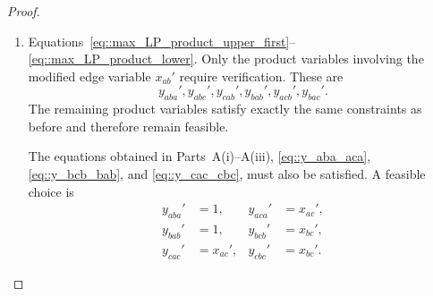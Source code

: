 \documentclass[11pt]{article}
\begin{document}
\begin{proof}
\begin{enumerate}[label=\Alph*.]
\begin{enumerate}[label=(\roman*)]
        \item Consider $y_{bab}'$ and $y_{bcb}'$. By Equation~\eqref{eq::y_bab_bcb}, $y_{bab}'+y_{bcb}'=x_{ab}'+x_{bc}'$ which is satisfied by the selection
          \[
          y_{bab}'=x_{ab}',\quad y_{bcb}'=x_{bc}'. 
          \] 
          Equation~\eqref{eq::max_LP_symmetry_x} and Equation~\eqref{eq::max_LP_x_upper_bound} giving $x_{ab}' \leq 1$, $x_{bc}' \leq 1$ gives
          \[
          y_{bab}'=x_{ab}' \leq x_{ba}',\quad y_{bab}'=x_{ab}'\leq x_{ab}', \quad y_{bab}'=x_{ab}' \geq x_{ba}'+x_{ab}'-1
          \]
          \[
          y_{bcb}'=x_{bc}' \leq x_{bc},\quad y_{bcb}'=x_{bc}' \leq x_{cb}', \quad y_{bcb}'=x_{bc}' \geq x_{bc}'+x_{cb}'-1
          \]
          Hence Equations~\eqref{eq::max_LP_product_upper_first}--\eqref{eq::max_LP_product_lower} are satisfied.
        \item Consider $y_{abc}'$. Since $x_{ab}'=1$, Equations~\eqref{eq::max_LP_product_upper_first}--\eqref{eq::max_LP_product_lower} give
          \[
          y_{abc}'\ge x_{ab}'+x_{bc}'-1 = x_{bc}', \quad  y_{abc}' \leq x_{ab}', \quad  y_{abc}' \leq x_{bc}'.
          \]
          If $x_{bc}' < 1$, then $y_{abc}' = x_{bc}'$ satisfies all constraints and if $x_{bc}'=1$ then $y_{abc}' = 1$ satisfies all constraints.  
        \item Consider $y_{acb}'$. Since neither $x_{ac}'$ nor $x_{cb}'$ has been modified, all three product constraints are unchanged and therefore remain satisfied.
      \end{enumerate}
    \item Equations~\eqref{eq::max_LP_product_upper_first}--\eqref{eq::max_LP_product_lower}.
      Only the product variables involving the modified edge variable
      $x_{ab}'$ require verification. These are
      \[
      y_{aba}', y_{abc}', y_{cab}', y_{bab}', y_{acb}', y_{bac}'. 
      \]
      The remaining product variables satisfy exactly the same constraints as
      before and therefore remain feasible.

      The equations obtained in Parts~A(i)--A(iii),
      \eqref{eq::y_aba_aca},
      \eqref{eq::y_bcb_bab},
      and
      \eqref{eq::y_cac_cbc},
      must also be satisfied. A feasible choice is
      \[
      \begin{aligned}
      y_{aba}'&=1, &
      y_{aca}'&=x_{ac}',\\
      y_{bab}'&=1, &
      y_{bcb}'&=x_{bc}',\\
      y_{cac}'&=x_{ac}', &
      y_{cbc}'&=x_{bc}'.
      \end{aligned}
      \]


\end{enumerate}
\end{proof}
\end{document}
